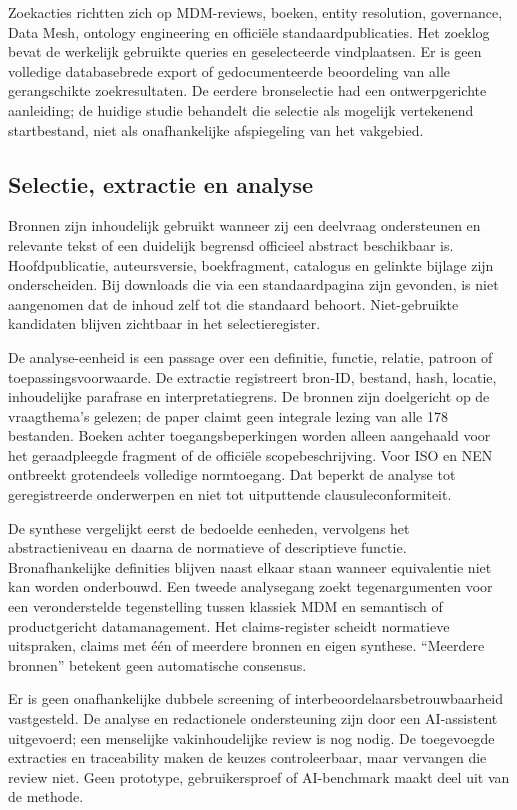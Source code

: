 Zoekacties richtten zich op MDM-reviews, boeken, entity resolution, governance, Data Mesh, ontology engineering en officiële standaardpublicaties. Het zoeklog bevat de werkelijk gebruikte queries en geselecteerde vindplaatsen. Er is geen volledige databasebrede export of gedocumenteerde beoordeling van alle gerangschikte zoekresultaten. De eerdere bronselectie had een ontwerpgerichte aanleiding; de huidige studie behandelt die selectie als mogelijk vertekenend startbestand, niet als onafhankelijke afspiegeling van het vakgebied.

\subsection{Selectie, extractie en analyse}
Bronnen zijn inhoudelijk gebruikt wanneer zij een deelvraag ondersteunen en relevante tekst of een duidelijk begrensd officieel abstract beschikbaar is. Hoofdpublicatie, auteursversie, boekfragment, catalogus en gelinkte bijlage zijn onderscheiden. Bij downloads die via een standaardpagina zijn gevonden, is niet aangenomen dat de inhoud zelf tot die standaard behoort. Niet-gebruikte kandidaten blijven zichtbaar in het selectieregister.

De analyse-eenheid is een passage over een definitie, functie, relatie, patroon of toepassingsvoorwaarde. De extractie registreert bron-ID, bestand, hash, locatie, inhoudelijke parafrase en interpretatiegrens. De bronnen zijn doelgericht op de vraagthema's gelezen; de paper claimt geen integrale lezing van alle 178 bestanden. Boeken achter toegangsbeperkingen worden alleen aangehaald voor het geraadpleegde fragment of de officiële scopebeschrijving. Voor ISO en NEN ontbreekt grotendeels volledige normtoegang. Dat beperkt de analyse tot geregistreerde onderwerpen en niet tot uitputtende clausuleconformiteit.

De synthese vergelijkt eerst de bedoelde eenheden, vervolgens het abstractieniveau en daarna de normatieve of descriptieve functie. Bronafhankelijke definities blijven naast elkaar staan wanneer equivalentie niet kan worden onderbouwd. Een tweede analysegang zoekt tegenargumenten voor een veronderstelde tegenstelling tussen klassiek MDM en semantisch of productgericht datamanagement. Het claims-register scheidt normatieve uitspraken, claims met één of meerdere bronnen en eigen synthese. ``Meerdere bronnen'' betekent geen automatische consensus.

Er is geen onafhankelijke dubbele screening of interbeoordelaarsbetrouwbaarheid vastgesteld. De analyse en redactionele ondersteuning zijn door een AI-assistent uitgevoerd; een menselijke vakinhoudelijke review is nog nodig. De toegevoegde extracties en traceability maken de keuzes controleerbaar, maar vervangen die review niet. Geen prototype, gebruikersproef of AI-benchmark maakt deel uit van de methode.


